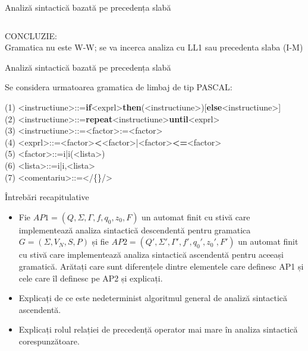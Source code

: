 \documentclass[pdf]{beamer}
\begin{document}
\begin{frame}{Analiză sintactică bazată pe precedența slabă}
\begin{center}
\begin{table}
\begin{tabular}{| c | c | c | c | c | c | c | c | c | c | c | c | c | c | c | }
\end{tabular}
\end{table}
\end{center}
\scriptsize	
\color{red}
CONCLUZIE:\\
Gramatica nu este W-W; se va incerca analiza cu LL1 sau precedenta slaba (I-M)\\
\end{frame}



\begin{frame}{Analiză sintactică bazată pe precedența slabă}
\begin{center}
    {Se considera urmatoarea gramatica de limbaj de tip PASCAL:}\\
\end{center}
\scriptsize
    (1) <instructiune>::=\textbf{if}<exprl>\textbf{then}(<instructiune>)[\textbf{else}<instructiune>]\\
    (2) <instructiune>::=\textbf{repeat}<instructiune>\textbf{until}<exprl>\\
    (3) <instructiune>::=<factor>:=<factor>\\
    (4) <exprl>::=<factor>\textbf{<}<factor>|<factor>\textbf{<=}<factor>\\
    (5) <factor>::=i|i(<lista>)\\
    (6) <lista>::=i|i,<lista>\\
    (7) <comentariu>::=</\{<orice caracter>\}/>\\
\end{frame}






\begin{frame}{Întrebări recapitulative}
\begin{itemize}
\item
Fie $AP1=(Q, \Sigma, \Gamma, f, q_0, z_0, F)$ un automat finit cu stivă care implementează analiza sintactică descendentă pentru gramatica $G=(\Sigma, V_N, S, P)$ și fie $AP2=(Q', \Sigma ', \Gamma ', f', q_0 ', z_0 ', F')$ un automat finit cu stivă care implementează analiza sintactică ascendentă pentru aceeași gramatică. Arătați care sunt diferențele dintre elementele care definesc AP1 și cele care îl definesc pe AP2 și explicați.
\newline

\item
Explicați de ce este nedeterminist algoritmul general de analiză sintactică ascendentă.
\newline

\item
Explicați rolul relației de precedență operator mai mare în analiza sintactică corespunzătoare.

\end{itemize}
\end{frame}
\end{document}
